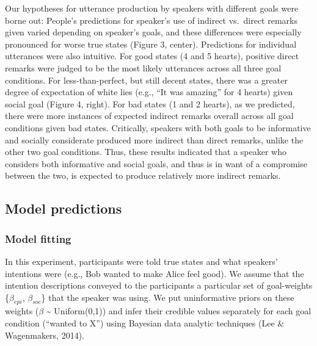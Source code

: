 \documentclass[10pt, letterpaper]{article}
\begin{document}
Our hypotheses for utterance production by speakers with different goals
were borne out: People's predictions for speaker's use of indirect
vs.~direct remarks given varied depending on speaker's goals, and these
differences were especially pronounced for worse true states (Figure 3,
center). Predictions for individual utterances were also intuitive. For
good states (4 and 5 hearts), positive direct remarks were judged to be
the most likely utterances across all three goal conditions. For
less-than-perfect, but still decent states, there was a greater degree
of expectation of white lies (e.g., ``It was amazing'' for 4 hearts)
given social goal (Figure 4, right). For bad states (1 and 2 hearts), as
we predicted, there were more instances of expected indirect remarks
overall across all goal conditions given bad states. Critically,
speakers with both goals to be informative and socially considerate
produced more indirect than direct remarks, unlike the other two goal
conditions. Thus, these results indicated that a speaker who considers
both informative and social goals, and thus is in want of a compromise
between the two, is expected to produce relatively more indirect
remarks.

\subsection{Model predictions}\label{model-predictions}

\subsubsection{Model fitting}\label{model-fitting}

In this experiment, participants were told true states and what
speakers' intentions were (e.g., Bob wanted to make Alice feel good). We
assume that the intention descriptions conveyed to the participants a
particular set of goal-weights \{\(\beta_{epi}\), \(\beta_{soc}\)\} that
the speaker was using. We put uninformative priors on these weights
(\(\beta\) \textasciitilde{} Uniform(0,1)) and infer their credible
values separately for each goal condition (``wanted to X'') using
Bayesian data analytic techniques (Lee \& Wagenmakers, 2014).
\end{document}
